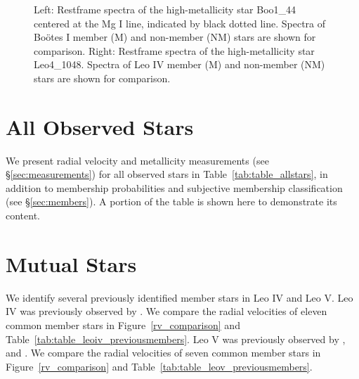 \documentclass[twocolumn]{aastex63}
\begin{document}
\begin{figure}
\centering
{}
\caption{Left: Restframe spectra of the high-metallicity star Boo1\_44 centered at the Mg I line, indicated by black dotted line. Spectra of Bo{\"o}tes I member (M) and non-member (NM) stars are shown for comparison. Right: Restframe spectra of the high-metallicity star Leo4\_1048. Spectra of Leo IV member (M) and non-member (NM) stars are shown for comparison.
  \label{fig:mgline}}
\end{figure}


\section{All Observed Stars}
\label{sec:allstars}
We present radial velocity and metallicity measurements (see \S\ref{sec:measurements}) for all observed stars in Table~\ref{tab:table_allstars}, in addition to membership probabilities and subjective membership classification (see \S\ref{sec:members}). A portion of the table is shown here to demonstrate its content. 


\section{Mutual Stars}
\label{sec:mutualstars}
We identify several previously identified member stars in Leo IV and Leo V. Leo IV was previously observed by \citet{sim2007}. We compare the radial velocities of eleven common member stars in Figure~\ref{rv_comparison} and Table~\ref{tab:table_leoiv_previousmembers}. Leo V was previously observed by \citet{wal2009}, \citet{col2017} and \citet{mut2020}. We compare the radial velocities of seven common member stars in Figure~\ref{rv_comparison} and Table~\ref{tab:table_leov_previousmembers}.


%
%
\end{document}
